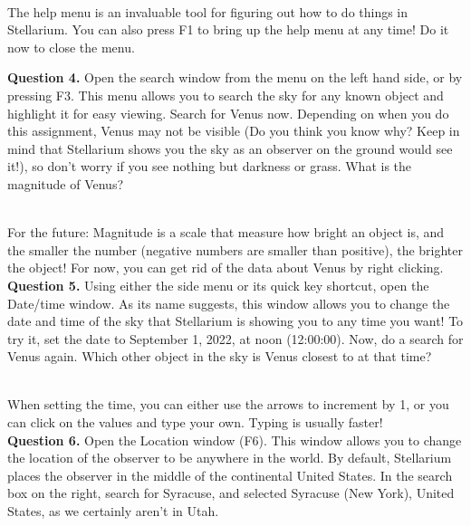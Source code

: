 \documentclass[11pt]{article}
\begin{document}
\hrulefill\\

The help menu is an invaluable tool for figuring out how to do things in Stellarium. You can also press F1 to bring up the help menu at any time! Do it now to close the menu.

\newpage

\textbf{Question 4.} Open the search window from the menu on the left hand side, or by pressing F3. This menu allows you to search the sky for any known object and highlight it for easy viewing. Search for Venus now. Depending on when you do this assignment, Venus may not be visible (Do you think you know why? Keep in mind that Stellarium shows you the sky as an observer on the ground would see it!), so don't worry if you see nothing but darkness or grass. What is the magnitude of Venus?\\
\vspace*{1.5cm}

\hrulefill\\
For the future: Magnitude is a scale that measure how bright an object is, and the smaller the number (negative numbers are smaller than positive), the brighter the object! For now, you can get rid of the data about Venus by right clicking.\\

\textbf{Question 5.} Using either the side menu or its quick key shortcut, open the Date/time window. As its name suggests, this window allows you to change the date and time of the sky that Stellarium is showing you to any time you want! To try it, set the date to September 1, 2022, at noon (12:00:00). Now, do a search for Venus again. Which other object in the sky is Venus closest to at that time?\\
\vspace*{1.5cm}

\hrulefill\\
When setting the time, you can either use the arrows to increment by 1, or you can click on the values and type your own. Typing is usually faster!\\

\textbf{Question 6.} Open the Location window (F6). This window allows you to change the location of the observer to be anywhere in the world. By default, Stellarium places the observer in the middle of the continental United States. In the search box on the right, search for Syracuse, and selected Syracuse (New York), United States, as we certainly aren't in Utah.\\
\end{document}

